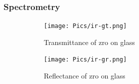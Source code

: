 

\subsubsection{Spectrometry}

\begin{figure}[htb]
    \centering
    \begin{subfigure}{.49\textwidth}
        \centering
        \texttt{[image: Pics/ir-gt.png]}
        \caption{Transmittance of \gls{zro} on glass} \label{fig:ir-gt}
    \end{subfigure}
    \begin{subfigure}{.49\textwidth}
        \centering
        \texttt{[image: Pics/ir-gr.png]}
        \caption{Reflectance of \gls{zro} on glass} \label{fig:ir-gr}
    \end{subfigure}
    \caption{} \label{fig:ir}
\end{figure}

